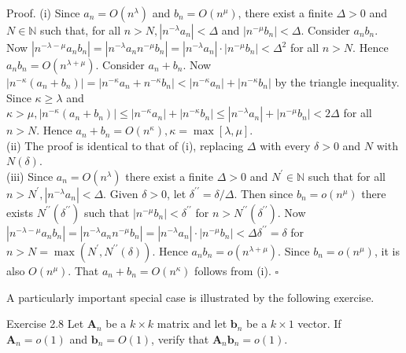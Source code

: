 \documentclass[10pt]{article}
\begin{document}
Proof. (i) Since $a_{n}=O\left(n^{\lambda}\right)$ and $b_{n}=O\left(n^{\mu}\right)$, there exist a finite $\Delta>0$ and $N \in \mathbb{N}$ such that, for all $n>N,\left|n^{-\lambda} a_{n}\right|<\Delta$ and $\left|n^{-\mu} b_{n}\right|<\Delta$. Consider $a_{n} b_{n}$. Now $\left|n^{-\lambda-\mu} a_{n} b_{n}\right|=\left|n^{-\lambda} a_{n} n^{-\mu} b_{n}\right|=\left|n^{-\lambda} a_{n}\right| \cdot\left|n^{-\mu} b_{n}\right|<\Delta^{2}$ for all $n>N$. Hence $a_{n} b_{n}=O\left(n^{\lambda+\mu}\right)$. Consider $a_{n}+b_{n}$. Now $\left|n^{-\kappa}\left(a_{n}+b_{n}\right)\right|= \left|n^{-\kappa} a_{n}+n^{-\kappa} b_{n}\right|<\left|n^{-\kappa} a_{n}\right|+\left|n^{-\kappa} b_{n}\right|$ by the triangle inequality. Since $\kappa \geq \lambda$ and $\kappa>\mu,\left|n^{-\kappa}\left(a_{n}+b_{n}\right)\right| \leq\left|n^{-\kappa} a_{n}\right|+\left|n^{-\kappa} b_{n}\right| \leq\left|n^{-\lambda} a_{n}\right|+\left|n^{-\mu} b_{n}\right|<2 \Delta$ for all $n>N$. Hence $a_{n}+b_{n}=O\left(n^{\kappa}\right), \kappa=\max [\lambda, \mu]$.\\
(ii) The proof is identical to that of (i), replacing $\Delta$ with every $\delta>0$ and $N$ with $N(\delta)$.\\
(iii) Since $a_{n}=O\left(n^{\lambda}\right)$ there exist a finite $\Delta>0$ and $N^{\prime} \in \mathbb{N}$ such that for all $n>N^{\prime},\left|n^{-\lambda} a_{n}\right|<\Delta$. Given $\delta>0$, let $\delta^{\prime \prime}=\delta / \Delta$. Then since $b_{n}=o\left(n^{\mu}\right)$ there exists $N^{\prime \prime}\left(\delta^{\prime \prime}\right)$ such that $\left|n^{-\mu} b_{n}\right|<\delta^{\prime \prime}$ for $n>N^{\prime \prime}\left(\delta^{\prime \prime}\right)$. Now $\left|n^{-\lambda-\mu} a_{n} b_{n}\right|=\left|n^{-\lambda} a_{n} n^{-\mu} b_{n}\right|=\left|n^{-\lambda} a_{n}\right| \cdot\left|n^{-\mu} b_{n}\right|<\Delta \delta^{\prime \prime}=\delta$ for $n>N=\max \left(N^{\prime}, N^{\prime \prime}(\delta)\right)$. Hence $a_{n} b_{n}=o\left(n^{\lambda+\mu}\right)$. Since $b_{n}=o\left(n^{\mu}\right)$, it is also $O\left(n^{\mu}\right)$. That $a_{n}+b_{n}=O\left(n^{\kappa}\right)$ follows from (i). \(\square\)

A particularly important special case is illustrated by the following exercise.

Exercise 2.8 Let $\mathbf{A}_{n}$ be a $k \times k$ matrix and let $\mathbf{b}_{n}$ be a $k \times 1$ vector. If $\mathbf{A}_{n}=o(1)$ and $\mathbf{b}_{n}=O(1)$, verify that $\mathbf{A}_{n} \mathbf{b}_{n}=o(1)$.
\end{document}
